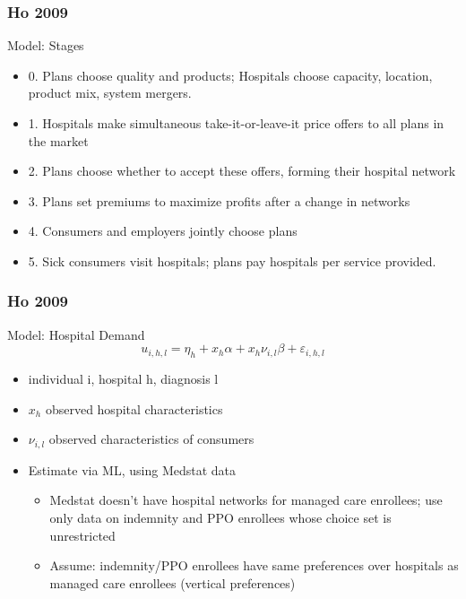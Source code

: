 \documentclass[notes=show]{beamer}
\begin{document}
\begin{frame}
\frametitle{Ho 2009}

Model: Stages
\begin{itemize}
\item 0. Plans choose quality and products; Hospitals choose capacity, location, product mix, system mergers.
\item 1. Hospitals make simultaneous take-it-or-leave-it price offers to all plans in the market
\item 2. Plans choose whether to accept these offers, forming their hospital network
\item 3. Plans set premiums to maximize profits after a change in networks
\item 4. Consumers and employers jointly choose plans
\item 5. Sick consumers visit hospitals; plans pay hospitals per service provided.
\end{itemize}
\end{frame}
\begin{frame}
\frametitle{Ho 2009}

Model: Hospital Demand
\[
u_{i,h,l}=\eta _{h}+x_{h}\alpha +x_{h}\nu _{i,l}\beta +\varepsilon _{i,h,l}
\]

\begin{itemize}
\item individual i, hospital h, diagnosis l
\item $x_{h}$ observed hospital characteristics
\item $\nu_{i,l}$ observed characteristics of consumers
\item Estimate via ML, using Medstat data
\begin{itemize}
\item Medstat doesn't have hospital networks for managed care enrollees; use only data on indemnity and PPO enrollees whose choice set is unrestricted
\item Assume: indemnity/PPO enrollees have same preferences over hospitals as managed care enrollees (vertical preferences)
\end{itemize}
\end{itemize}

\end{frame}
\end{document}
